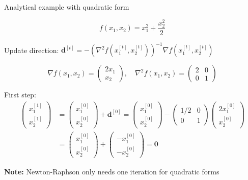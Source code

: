 \documentclass[11pt,compress,t,notes=noshow, xcolor=table]{beamer}
\begin{document}
\begin{vbframe}{Analytical example with quadratic form}

\begin{equation*}
    f(x_1, x_2) = x_1^2 + \frac{x_2^2}{2}
\end{equation*}

Update direction: $\mathbf{d}^{[t]} = -\left( \nabla^2 f(x_1^{[t]}, x_2^{[t]}) \right)^{-1} \nabla f(x_1^{[t]}, x_2^{[t]})$

\begin{equation*}
    \nabla f(x_1, x_2) = \begin{pmatrix}2x_1 \\ x_2\end{pmatrix}, \quad
    \nabla^2 f(x_1, x_2) = \begin{pmatrix}2 & 0 \\ 0 & 1\end{pmatrix}
\end{equation*}

First step:
\begin{align*}
    \begin{pmatrix}
        x_1^{[1]} \\ x_2^{[1]}
    \end{pmatrix} &= \begin{pmatrix}
        x_1^{[0]} \\ x_2^{[0]}
    \end{pmatrix} + \mathbf{d}^{[0]} = \begin{pmatrix}
        x_1^{[0]} \\ x_2^{[0]}
    \end{pmatrix} - \begin{pmatrix}
    1/2 &  0 \\ 0 & 1
    \end{pmatrix} \begin{pmatrix}
        2x_1^{[0]} \\ x_2^{[0]}
    \end{pmatrix} \\
    &= \begin{pmatrix}
        x_1^{[0]} \\ x_2^{[0]}
    \end{pmatrix} + \begin{pmatrix}
        -x_1^{[0]} \\
        -x_2^{[0]}
    \end{pmatrix} = \mathbf{0}
\end{align*}

\textbf{Note:} Newton-Raphson only needs one iteration for quadratic forms

\end{vbframe}
\end{document}
